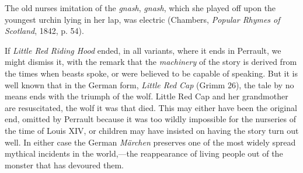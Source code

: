 \documentclass[14pt,a4paper]{memoir}
\begin{document}
\textquotesingle The old nurse\textquotesingle s imitation of the
\emph{gnash}, \emph{gnash}, which she played off upon the youngest
urchin lying in her lap, was electric\textquotesingle{} (Chambers,
\emph{Popular Rhymes of Scotland}, 1842, p. 54).

If \emph{Little Red Riding Hood} ended, in all variants, where it ends
in Perrault, we might dismiss it, with the remark that the
\emph{machinery} of the story is derived from \textquotesingle the times
when beasts spoke,\textquotesingle{} or were believed to be capable of
speaking. But it is well known that in the German form, \emph{Little Red
Cap} (Grimm 26), the tale by no means ends with the triumph of the wolf.
Little Red Cap and her grandmother are resuscitated,
\textquotesingle the wolf it was that died.\textquotesingle{} This may
either have been the original end, omitted by Perrault because it was
too wildly impossible for the nurseries of the time of Louis XIV, or
children may have insisted on having the story \textquotesingle turn out
well.\textquotesingle{} In either case the German \emph{Märchen}
preserves one of the most widely spread mythical incidents in the
world,---the reappearance of living people out of the monster that has
devoured them.
\end{document}
